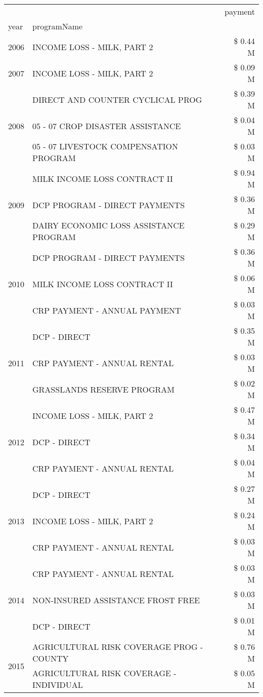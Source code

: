 \begin{tabular}{llr}
\toprule
 &  & payment \\
year & programName &  \\
\midrule
2006 & INCOME LOSS - MILK, PART 2 & \$ 0.44 M \\
\cline{1-3}
2007 & INCOME LOSS - MILK, PART 2 & \$ 0.09 M \\
\cline{1-3}
\multirow[t]{3}{*}{2008} & DIRECT AND COUNTER CYCLICAL PROG & \$ 0.39 M \\
 & 05 - 07 CROP DISASTER ASSISTANCE & \$ 0.04 M \\
 & 05 - 07 LIVESTOCK COMPENSATION PROGRAM & \$ 0.03 M \\
\cline{1-3}
\multirow[t]{3}{*}{2009} & MILK INCOME LOSS CONTRACT II & \$ 0.94 M \\
 & DCP PROGRAM - DIRECT PAYMENTS & \$ 0.36 M \\
 & DAIRY ECONOMIC LOSS ASSISTANCE PROGRAM & \$ 0.29 M \\
\cline{1-3}
\multirow[t]{3}{*}{2010} & DCP PROGRAM - DIRECT PAYMENTS & \$ 0.36 M \\
 & MILK INCOME LOSS CONTRACT II & \$ 0.06 M \\
 & CRP PAYMENT - ANNUAL PAYMENT & \$ 0.03 M \\
\cline{1-3}
\multirow[t]{3}{*}{2011} & DCP - DIRECT & \$ 0.35 M \\
 & CRP PAYMENT - ANNUAL RENTAL & \$ 0.03 M \\
 & GRASSLANDS RESERVE PROGRAM & \$ 0.02 M \\
\cline{1-3}
\multirow[t]{3}{*}{2012} & INCOME LOSS - MILK, PART 2 & \$ 0.47 M \\
 & DCP - DIRECT & \$ 0.34 M \\
 & CRP PAYMENT - ANNUAL RENTAL & \$ 0.04 M \\
\cline{1-3}
\multirow[t]{3}{*}{2013} & DCP - DIRECT & \$ 0.27 M \\
 & INCOME LOSS - MILK, PART 2 & \$ 0.24 M \\
 & CRP PAYMENT - ANNUAL RENTAL & \$ 0.03 M \\
\cline{1-3}
\multirow[t]{3}{*}{2014} & CRP PAYMENT - ANNUAL RENTAL & \$ 0.03 M \\
 & NON-INSURED ASSISTANCE FROST FREE & \$ 0.03 M \\
 & DCP - DIRECT & \$ 0.01 M \\
\cline{1-3}
\multirow[t]{3}{*}{2015} & AGRICULTURAL RISK COVERAGE PROG - COUNTY & \$ 0.76 M \\
 & AGRICULTURAL RISK COVERAGE - INDIVIDUAL & \$ 0.05 M \\

\end{tabular}
